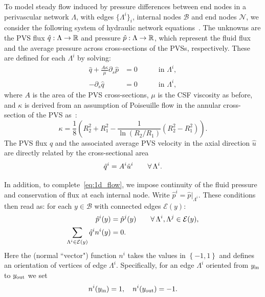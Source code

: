 \documentclass[fleqn,10pt]{wlscirep}
\begin{document}
To model steady flow induced by pressure differences between end nodes
in a perivascular network $\Lambda$, with edges $\{\Lambda^i\}_i$,
internal nodes $\mathcal{B}$ and end nodes $\mathcal{N}$, we consider
the following system of hydraulic network
equations~\cite{tithof2022network, daversin2022geometrically,
  gjerde2024directional}. The unknowns are the PVS flux $\hat{q} :
\Lambda \rightarrow \mathbb{R}$ and pressure $\hat{p} : \Lambda
\rightarrow \mathbb{R}$, which represent the fluid flux and the average
pressure across cross-sections of the PVSs, respectively. These are
defined for each $\Lambda^i$ by solving:
\begin{subequations}
\begin{alignat}{2}
  \hat{q} + \frac{A \kappa}{\mu} \partial_{s} \hat{p} & = 0 &&
  \quad \text{ in } \Lambda^i , \\ 
  - \partial_s \hat{q} & = 0 &&
  \quad \text{ in } \Lambda^i ,  
\end{alignat} 
\label{eq:1d_flow}%
\end{subequations}%
where $A$ is the area of the PVS cross-sections, $\mu$ is the CSF viscosity as before, and $\kappa$ is derived from an assumption of Poiseuille flow in the annular cross-section of the PVS as~\cite{tithof2022network}: 
\begin{equation}
\kappa = \frac18 \left( R_2^2 + R_1^2 - \frac{1}{\ln(R_2/R_1)} (R_2^2- R_1^2) \right). 
\end{equation}
The PVS flux $\hat{q}$ and the associated average PVS velocity in the
axial direction $\hat{u}$ are directly related by the cross-sectional area
\begin{equation}
  \hat{q}^i = A^i \hat{u}^i \qquad \forall \, \Lambda^i.
\end{equation}

In addition, to complete~\eqref{eq:1d_flow}, we impose continuity of
the fluid pressure and conservation of flux at each internal node. Write
$\hat{p}^i = \hat{p}|_{\Lambda^i}$. These conditions then read as: for
each $y \in \mathcal{B}$ with connected edges $\mathcal{E}(y)$:
\begin{subequations}
\begin{align}
  \hat{p}^i(y) &= \hat{p}^j(y) \qquad \forall \, \Lambda^i, \Lambda^j \in \mathcal{E}(y), \\
  \sum_{\Lambda^i \in \mathcal{E}(y)} \hat{q}^i n^i(y) &= 0  .
\end{align}
\label{eq:1d_flow:bifurcations}
\end{subequations}
Here the (normal ``vector") function $n^i$ takes the values in $\left\{-1, 1\right\}$ and 
defines an orientation of vertices of edge $\Lambda^i$. Specifically, for an edge $\Lambda^i$ oriented from $y_{\rm in}$ to $y_{\rm out}$ we set 
\begin{equation}
  n^i(y_{\rm in}) = 1,\quad
  n^i(y_{\rm{out}}) = -1. %
\label{eq:def:sign}
\end{equation}
\end{document}
